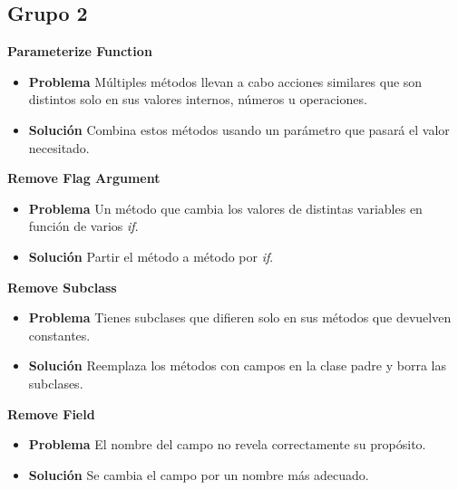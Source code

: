 \documentclass[11pt,a4paper,oneside]{book}
\begin{document}

\subsection{Grupo 2}
\textbf{Parameterize Function}
\label{ParameterizeFunction}
\begin{itemize}
    \item \textbf{Problema} Múltiples métodos llevan a cabo acciones similares que son distintos solo en sus valores internos, números u operaciones.
    
    
    \item \textbf{Solución} Combina estos métodos usando un parámetro que pasará el valor necesitado.
      
\end{itemize}

\textbf{Remove Flag Argument}
\label{RemoveFlagArgument}
\begin{itemize}
    \item \textbf{Problema} Un método que cambia los valores de distintas variables en función de varios \textit{if}.
    
    \item \textbf{Solución} Partir el método a método por \textit{if}.
    
\end{itemize}


\textbf{Remove Subclass}
\label{RemobeSubclass}
\begin{itemize}
    \item \textbf{Problema} Tienes subclases que difieren solo en sus métodos que devuelven constantes.
    
    \item \textbf{Solución} Reemplaza los métodos con campos en la clase padre y borra las subclases.
    
\end{itemize}

\textbf{Remove Field}
\label{RenameField}
\begin{itemize}
    \item \textbf{Problema} El nombre del campo no revela correctamente su propósito.
    
    \item \textbf{Solución} Se cambia el campo por un nombre más adecuado.
    
\end{itemize}
\end{document}
